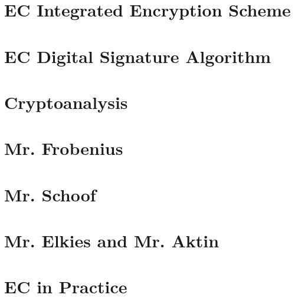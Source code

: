 \documentclass[tikz]{scrreprt}
\begin{document}
\section{EC Integrated Encryption Scheme} 
\section{EC Digital Signature Algorithm} 
\section{Cryptoanalysis} 
\section{Mr. Frobenius} 
\section{Mr. Schoof} 
\section{Mr. Elkies and Mr. Aktin} 
\section{EC in Practice} 
\end{document}

